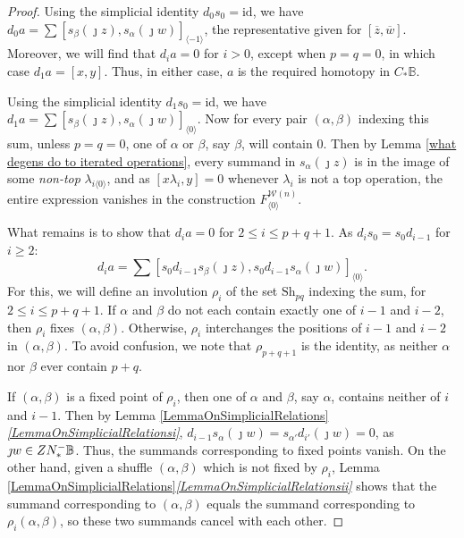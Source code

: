 \documentclass[11pt]{amsart} \renewcommand{\baselinestretch}{1.2}
\theoremstyle{plain}
\numberwithin{equation}{section} %
\theoremstyle{plain}
\numberwithin{equation}{chapter} %
\newcommand{\calw}{\mathcal{W}}
\newcommand{\Shuffles}[2]{\mathrm{Sh}_{#1#2}}
\newcommand{\Nop}{N^{\smash{-}}}
\newcommand{\Id}{\mathrm{id}}
\begin{document}
\begin{Koszul complexes}
\begin{proof}
Using the simplicial identity $d_0s_0=\Id$, we have $d_{0}a=\sum [s_\beta(\jmath z), s_\alpha(\jmath w)]_{\langle -1\rangle}$, the representative given for $[\overline{z},\overline{w}]$. Moreover, we will find that $d_ia=0$ for $i>0$, except when $p=q=0$, in which case $d_1a=[x,y]$. Thus, in either case, $a$ is the required homotopy in $C_*\mathbb{B}$.

Using the simplicial identity $d_1s_0=\Id$, we have $d_{1}a=\sum [s_\beta(\jmath z), s_\alpha(\jmath w)]_{\langle 0\rangle}$. Now for every pair $(\alpha,\beta)$ indexing this sum, unless $p=q=0$, one of $\alpha$ or $\beta$, say $\beta$, will contain $0$. Then by Lemma \ref{what degens do to iterated operations}, every summand in $s_{\alpha}(\jmath z)$ is in the image of some \emph{non-top} $\lambda_{i\langle 0\rangle}$, and as $[x\lambda_i,y]=0$ whenever $\lambda_i$ is not a top operation, the entire expression vanishes in the construction $F^{\calw(n)}_{\langle 0\rangle}$.

What remains is to show that $d_{i}a=0$ for $2\leq i\leq p+q+1$. As $d_is_0=s_0d_{i-1}$ for $i\geq2$:
\[d_{i}a=\sum [s_{0}d_{i-1}s_\beta(\jmath z), s_{0}d_{i-1}s_\alpha(\jmath w)]_{\langle 0\rangle}.\]
For this, we will define an involution $\rho_i$ of the set $\Shuffles{p}{q}$ indexing the sum, for $2\leq i\leq p+q+1$.
If $\alpha$ and $\beta$ do not each contain exactly one of $i-1$ and $i-2$, then $\rho_i$ fixes $(\alpha,\beta)$. Otherwise, $\rho_i$ interchanges the positions of $i-1$ and $i-2$ in $(\alpha,\beta)$. To avoid confusion, we note that $\rho_{p+q+1}$ is the identity, as neither $\alpha$ nor $\beta$ ever contain $p+q$.

If $(\alpha,\beta)$ is a fixed point of $\rho_i$, then one of $\alpha$ and $\beta$, say $\alpha$, contains neither of $i$ and $i-1$. Then by Lemma \ref{LemmaOnSimplicialRelations}\emph{\ref{LemmaOnSimplicialRelationsi}}, $d_{i-1}s_\alpha(\jmath w)=s_{\alpha'}d_{i'}(\jmath w)=0$, as $\jmath w\in Z\Nop_*\mathbb{B}$. Thus, the summands corresponding to fixed points vanish.
On the other hand, given a shuffle $(\alpha,\beta)$ which is not fixed by $\rho_i$, Lemma \ref{LemmaOnSimplicialRelations}\emph{\ref{LemmaOnSimplicialRelationsii}} shows that the summand corresponding to $(\alpha,\beta)$ equals the summand corresponding to $\rho_i(\alpha,\beta)$, so these two summands cancel with each other.
\end{proof}


\end{Koszul complexes}
\end{document}
